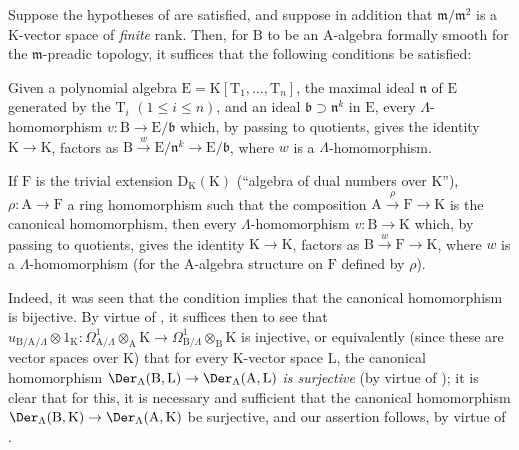 \begin{remark}[22.1.3]
\label{0.22.1.3}
Suppose the hypotheses of  are satisfied, and suppose in addition that $\mathfrak{m}/\mathfrak{m}^2$ is a $\mathrm{K}$-vector space of \emph{finite} rank.
Then, for $\mathrm{B}$ to be an $\mathrm{A}$-algebra formally smooth for the $\mathfrak{m}$-preadic topology, it suffices that the following conditions be satisfied:

\begin{env}[22.1.3.1]
\label{0.22.1.3.1}
Given a polynomial algebra $\mathrm{E}=\mathrm{K}[\mathrm{T}_1,\ldots,\mathrm{T}_n]$, the maximal ideal $\mathfrak{n}$ of $\mathrm{E}$ generated by the $\mathrm{T}_i$ $(1\leq i\leq n)$, and an ideal $\mathfrak{b}\supset\mathfrak{n}^k$ in $\mathrm{E}$, every $\Lambda$-homomorphism $v:\mathrm{B}\to\mathrm{E}/\mathfrak{b}$ which, by passing to quotients, gives the identity $\mathrm{K}\to\mathrm{K}$, factors as $\mathrm{B}\xrightarrow{w}\mathrm{E}/\mathfrak{n}^k\to\mathrm{E}/\mathfrak{b}$, where $w$ is a $\Lambda$-homomorphism.
\end{env}

\begin{env}[22.1.3.2]
\label{0.22.1.3.2}
If $\mathrm{F}$ is the trivial extension $\mathrm{D}_\mathrm{K}(\mathrm{K})$ (``algebra of dual numbers over $\mathrm{K}$''), $\rho:\mathrm{A}\to\mathrm{F}$ a ring homomorphism such that the composition $\mathrm{A}\xrightarrow{\rho}\mathrm{F}\to\mathrm{K}$ is the canonical homomorphism, then every $\Lambda$-homomorphism $v:\mathrm{B}\to\mathrm{K}$ which, by passing to quotients, gives the identity $\mathrm{K}\to\mathrm{K}$, factors as $\mathrm{B}\xrightarrow{w}\mathrm{F}\to\mathrm{K}$, where $w$ is a $\Lambda$-homomorphism (for the $\mathrm{A}$-algebra structure on $\mathrm{F}$ defined by $\rho$).
\end{env}

Indeed, it was seen  that the condition  implies that the canonical homomorphism  is bijective.
By virtue of , it suffices then to see that $u_{\mathrm{B}/\mathrm{A}/\Lambda}\otimes 1_\mathrm{K}:\Omega^1_{\mathrm{A}/\Lambda}\otimes_\mathrm{A}\mathrm{K}\to\Omega^1_{\mathrm{B}/\Lambda}\otimes_\mathrm{B}\mathrm{K}$ is injective, or equivalently (since these are vector spaces over $\mathrm{K}$) that for every $\mathrm{K}$-vector space $\mathrm{L}$, the canonical homomorphism $\Der_\Lambda(\mathrm{B},\mathrm{L})\to\Der_\Lambda(\mathrm{A},\mathrm{L})$ \emph{is surjective} (by virtue of ); it is clear that for this, it is necessary and sufficient that the canonical homomorphism $\Der_\Lambda(\mathrm{B},\mathrm{K})\to\Der_\Lambda(\mathrm{A},\mathrm{K})$ be surjective, and our assertion follows, by virtue of .


\end{remark}
